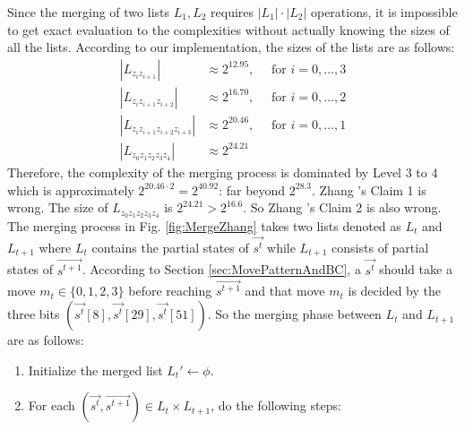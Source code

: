Since the merging of two lists $L_1,L_2$ requires $|L_1|\cdot |L_2|$ operations, it is impossible to get exact evaluation to the complexities without actually knowing the sizes of all the lists.
According to our implementation, the sizes of the lists are as follows:
\begin{equation}\label{eq:ListSizes}
  \begin{split}
  |L_{z_iz_{i+1}}| &\approx 2^{12.95},\quad \text{ for } i=0,\ldots, 3 \\
  |L_{z_iz_{i+1}z_{i+2}}| & \approx 2^{16.70},  \quad \text{ for } i=0,\ldots, 2\\
  |L_{z_iz_{i+1}z_{i+2}z_{i+3}}| & \approx 2^{20.46},  \quad \text{ for } i=0,\ldots, 1\\
  |L_{z_0z_{1}z_{2}z_{3}z_{4}}| & \approx 2^{24.21}
  \end{split}
\end{equation}
Therefore, the complexity of the merging process is dominated by Level 3 to 4 which is approximately $2^{20.46\cdot 2}=2^{40.92}$: far beyond $2^{28.3}$.
Zhang \etal's Claim 1 is wrong.
The size of $L_{z_0z_1z_2z_3z_4}$ is $2^{24.21}> 2^{16.6}$.
So Zhang \etal's Claim 2 is also wrong.
The merging process in Fig. \ref{fig:MergeZhang} takes two lists denoted as $L_t$ and $L_{t+1}$ where $L_{t}$ contains the partial states of $\vec{ s^t}$ while $L_{t+1}$ consists of partial states of $\vec{s^{t+1}}$.
According to Section \ref{sec:MovePatternAndBC}, a $\vec{s^t}$ should take a move $m_t\in \{0,1,2,3\}$ before reaching $\vec{s^{t+1}}$ and that move $m_t$ is decided by the three bits $(\vec{s^t}[8],\vec{s^t}[29],\vec{s^t}[51])$.
So the merging phase between $L_t$ and $L_{t+1}$ are as follows:
\begin{enumerate}
  \item Initialize the merged list $L_{t}'\leftarrow \phi$.
  \item For each $(\vec{s^t},\vec{s^{t+1}})\in L_t\times L_{t+1}$, do the following steps:
\end{enumerate}
